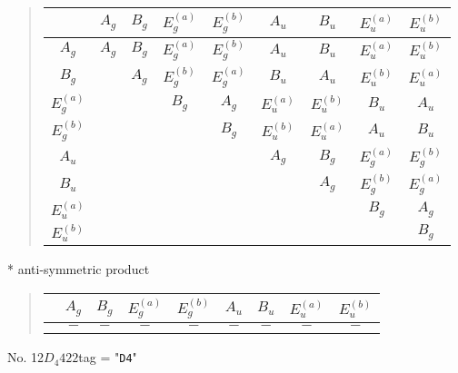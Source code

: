 \documentclass[fleqn,10pt,landscape]{jsarticle}
\begin{document}
\begin{quote}
\begin{tabular}{c|cccccccc} \hline \hline
 & $ A_{g} $ & $ B_{g} $ & $ E_{g}^{(a)} $ & $ E_{g}^{(b)} $ & $ A_{u} $ & $ B_{u} $ & $ E_{u}^{(a)} $ & $ E_{u}^{(b)} $ \\ \hline
$ A_{g} $ & $ A_{g} $ & $ B_{g} $ & $ E_{g}^{(a)} $ & $ E_{g}^{(b)} $ & $ A_{u} $ & $ B_{u} $ & $ E_{u}^{(a)} $ & $ E_{u}^{(b)} $ \\
$ B_{g} $ & $  $ & $ A_{g} $ & $ E_{g}^{(b)} $ & $ E_{g}^{(a)} $ & $ B_{u} $ & $ A_{u} $ & $ E_{u}^{(b)} $ & $ E_{u}^{(a)} $ \\
$ E_{g}^{(a)} $ & $  $ & $  $ & $ B_{g} $ & $ A_{g} $ & $ E_{u}^{(a)} $ & $ E_{u}^{(b)} $ & $ B_{u} $ & $ A_{u} $ \\
$ E_{g}^{(b)} $ & $  $ & $  $ & $  $ & $ B_{g} $ & $ E_{u}^{(b)} $ & $ E_{u}^{(a)} $ & $ A_{u} $ & $ B_{u} $ \\
$ A_{u} $ & $  $ & $  $ & $  $ & $  $ & $ A_{g} $ & $ B_{g} $ & $ E_{g}^{(a)} $ & $ E_{g}^{(b)} $ \\
$ B_{u} $ & $  $ & $  $ & $  $ & $  $ & $  $ & $ A_{g} $ & $ E_{g}^{(b)} $ & $ E_{g}^{(a)} $ \\
$ E_{u}^{(a)} $ & $  $ & $  $ & $  $ & $  $ & $  $ & $  $ & $ B_{g} $ & $ A_{g} $ \\
$ E_{u}^{(b)} $ & $  $ & $  $ & $  $ & $  $ & $  $ & $  $ & $  $ & $ B_{g} $ \\
 \hline \hline
\end{tabular}
\end{quote}
* anti-symmetric product
\begin{quote}
\begin{tabular}{ccccccccc} \hline \hline
 & $ A_{g} $ & $ B_{g} $ & $ E_{g}^{(a)} $ & $ E_{g}^{(b)} $ & $ A_{u} $ & $ B_{u} $ & $ E_{u}^{(a)} $ & $ E_{u}^{(b)} $ \\ \hline
$  $ & $ - $ & $ - $ & $ - $ & $ - $ & $ - $ & $ - $ & $ - $ & $ - $ \\
 \hline \hline
\end{tabular}
\end{quote}
\newpage
No. 12\quad$D_{4}$\quad$422$\quad[ tetragonal ]
tag = "{\tt D4}"
\end{document}
